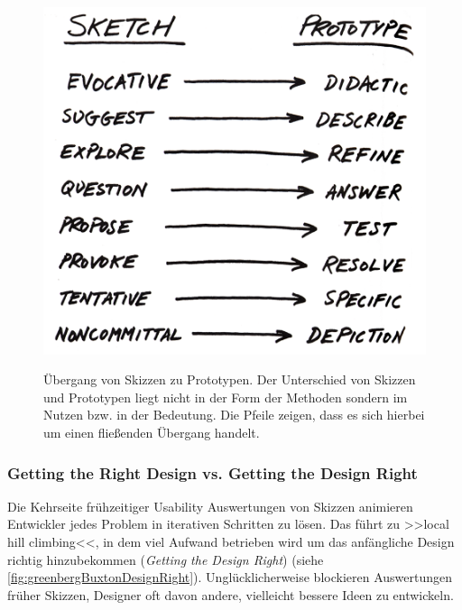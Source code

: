 \begin{figure}
	\begin{center}
        {\includegraphics[width=\linewidth]{gfx/buxtonSketch2prototype}}
	\end{center}
		\caption[Übergang von Skizzen zu Prototypen. \newline \citep{Buxton:2007}]{Übergang von Skizzen zu Prototypen. Der Unterschied von Skizzen und Prototypen liegt nicht in der Form der Methoden sondern im Nutzen bzw. in der Bedeutung. Die Pfeile zeigen, dass es sich hierbei um einen fließenden Übergang handelt.}\label{fig:buxtonSketch2prototype}
\end{figure}

\subsubsection{Getting the Right Design vs. Getting the Design Right} \label{sssec:rightDesign}
Die Kehrseite frühzeitiger Usability Auswertungen von Skizzen animieren Entwickler jedes Problem in iterativen Schritten zu lösen. Das führt zu >>local hill climbing<<, in dem viel Aufwand betrieben wird um das anfängliche Design richtig hinzubekommen (\emph{Getting the Design Right}) (siehe \autoref{fig:greenbergBuxtonDesignRight}). Unglücklicherweise blockieren Auswertungen früher Skizzen, Designer oft davon andere, vielleicht bessere Ideen zu entwickeln. \citep{Greenberg:2008}

